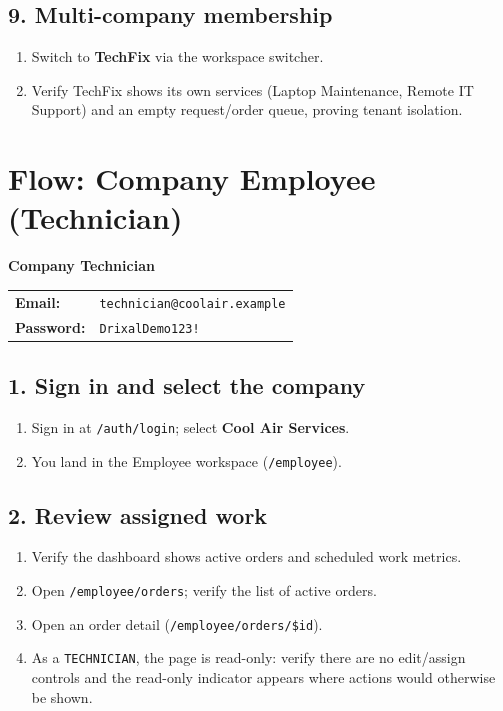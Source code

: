 \documentclass[11pt,a4paper]{article}
\makeatletter
\newcommand{\account}[3]{%
  \begin{tcolorbox}[colback=drixalsurface, colframe=drixalblue, boxrule=0.8pt, left=10pt, right=10pt, top=8pt, bottom=8pt, breakable]
    \textbf{\color{drixalblue}#1}\\
    \begin{tabular}{@{}ll}
      \textbf{Email:} & \texttt{#2} \\
      \textbf{Password:} & \texttt{#3} \\
    \end{tabular}
  \end{tcolorbox}
}
\makeatother
\begin{document}
\subsection{9. Multi-company membership}
\begin{enumerate}[leftmargin=2em, itemsep=2pt]
  \item Switch to \textbf{TechFix} via the workspace switcher.
  \item Verify TechFix shows its own services (Laptop Maintenance, Remote IT Support) and an empty request/order queue, proving tenant isolation.
\end{enumerate}

\section{Flow: Company Employee (Technician)}
\label{sec:flow-technician}

\account{Company Technician}{technician@coolair.example}{DrixalDemo123!}

\subsection{1. Sign in and select the company}
\begin{enumerate}[leftmargin=2em, itemsep=2pt]
  \item Sign in at \texttt{/auth/login}; select \textbf{Cool Air Services}.
  \item You land in the Employee workspace (\texttt{/employee}).
\end{enumerate}

\subsection{2. Review assigned work}
\begin{enumerate}[leftmargin=2em, itemsep=2pt]
  \item Verify the dashboard shows active orders and scheduled work metrics.
  \item Open \texttt{/employee/orders}; verify the list of active orders.
  \item Open an order detail (\texttt{/employee/orders/\$id}).
  \item As a \texttt{TECHNICIAN}, the page is read-only: verify there are no edit/assign controls and the read-only indicator appears where actions would otherwise be shown.
\end{enumerate}
\end{document}
